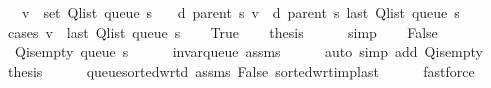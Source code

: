 \begin{isabellebody}
\ \ \ {\isachardoublequoteopen}v\ {\isasymin}\ set\ {\isacharparenleft}{\kern0pt}Q{\isacharunderscore}{\kern0pt}list\ {\isacharparenleft}{\kern0pt}queue\ s{\isacharparenright}{\kern0pt}{\isacharparenright}{\kern0pt}{\isachardoublequoteclose}\isanewline
\ \ \ {\isachardoublequoteopen}d\ {\isacharparenleft}{\kern0pt}parent\ s{\isacharparenright}{\kern0pt}\ v\ {\isasymle}\ d\ {\isacharparenleft}{\kern0pt}parent\ s{\isacharparenright}{\kern0pt}\ {\isacharparenleft}{\kern0pt}last\ {\isacharparenleft}{\kern0pt}Q{\isacharunderscore}{\kern0pt}list\ {\isacharparenleft}{\kern0pt}queue\ s{\isacharparenright}{\kern0pt}{\isacharparenright}{\kern0pt}{\isacharparenright}{\kern0pt}{\isachardoublequoteclose}\isanewline
%
\isadelimproof
%
\endisadelimproof
%
\isatagproof
{}\isamarkupfalse%
\ {\isacharparenleft}{\kern0pt}cases\ {\isachardoublequoteopen}v\ {\isacharequal}{\kern0pt}\ last\ {\isacharparenleft}{\kern0pt}Q{\isacharunderscore}{\kern0pt}list\ {\isacharparenleft}{\kern0pt}queue\ s{\isacharparenright}{\kern0pt}{\isacharparenright}{\kern0pt}{\isachardoublequoteclose}{\isacharparenright}{\kern0pt}\isanewline
\ \ \isamarkupfalse%
\ True\isanewline
\ \ \isamarkupfalse%
\ {\isacharquery}{\kern0pt}thesis\isanewline
\ \ \ \ \isamarkupfalse%
\ simp\isanewline
{}\isamarkupfalse%
\isanewline
\ \ \isamarkupfalse%
\ False\isanewline
\ \ \isamarkupfalse%
\ {\isachardoublequoteopen}{\isasymnot}\ Q{\isacharunderscore}{\kern0pt}is{\isacharunderscore}{\kern0pt}empty\ {\isacharparenleft}{\kern0pt}queue\ s{\isacharparenright}{\kern0pt}{\isachardoublequoteclose}\isanewline
\ \ \ \ \isamarkupfalse%
\ invar{\isacharunderscore}{\kern0pt}queue\ assms\isanewline
\ \ \ \ \isamarkupfalse%
\ {\isacharparenleft}{\kern0pt}auto\ simp\ add{\isacharcolon}{\kern0pt}\ Q{\isachardot}{\kern0pt}is{\isacharunderscore}{\kern0pt}empty{\isacharparenright}{\kern0pt}\isanewline
\ \ \isamarkupfalse%
\ {\isacharquery}{\kern0pt}thesis\isanewline
\ \ \ \ \isamarkupfalse%
\ queue{\isacharunderscore}{\kern0pt}sorted{\isacharunderscore}{\kern0pt}wrt{\isacharunderscore}{\kern0pt}d\ assms\ False\ sorted{\isacharunderscore}{\kern0pt}wrt{\isacharunderscore}{\kern0pt}imp{\isacharunderscore}{\kern0pt}last\isanewline
\ \ \ \ \isamarkupfalse%
\ fastforce\isanewline
{}\isamarkupfalse%
%
\endisatagproof
{\isafoldproof}%
%
\isadelimproof
\isanewline
%
\endisadelimproof
\isanewline

\end{isabellebody}
